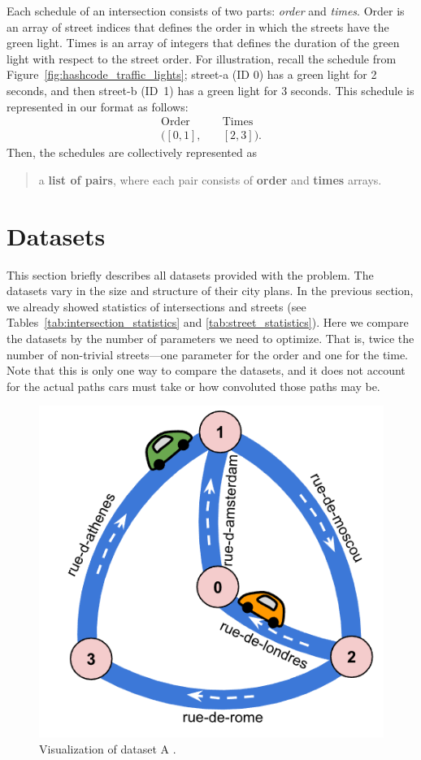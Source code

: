Each schedule of an intersection consists of two parts: \textit{order} and \textit{times}. Order is an array of street indices that defines the order in which the streets have the green light. Times is an array of integers that defines the duration of the green light with respect to the street order.
For illustration, recall the schedule from Figure~\ref{fig:hashcode_traffic_lights}; street-a (ID 0) has a green light for 2 seconds, and then street-b (ID~1) has a green light for 3 seconds. This schedule is represented in our format as follows:
\vspace{-0.4cm}
\begin{align*}
\text{Order} \quad& \text{Times} \\
\Big([0, 1], \quad& [2, 3]\Big).
\end{align*}
Then, the schedules are collectively represented as
\begin{quote}
    a \textbf{list of pairs}, where each pair consists of \textbf{order} and \textbf{times} arrays.
\end{quote}

\section{Datasets} \label{sec:datasets}

This section briefly describes all datasets provided with the problem.
The datasets vary in the size and structure of their city plans.
In the previous section, we already showed statistics of intersections and streets (see Tables~\ref{tab:intersection_statistics} and \ref{tab:street_statistics}).
Here we compare the datasets by the number of parameters we need to optimize.
That is, twice the number of non-trivial streets---one parameter for the order and one for the time. Note that this is only one way to compare the datasets, and it does not account for the actual paths cars must take or how convoluted those paths may be.

\begin{figure}[h]
    \centering
    \includegraphics[width=.5\linewidth]{img/hashcode/figure5.png}
    \caption[Visualization of dataset A]{
        Visualization of dataset A \cite{google2023google}.
    }
    \label{fig:hashcode_dataset_a}
\end{figure}

